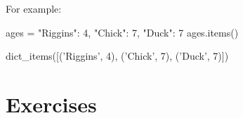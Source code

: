 For example:




\begin{pyin}
ages = {"Riggins": 4, "Chick": 7, "Duck": 7}
ages.items()
\end{pyin}





\begin{raw}
dict_items([('Riggins', 4), ('Chick', 7), ('Duck', 7)])
\end{raw}







\section{Exercises}
